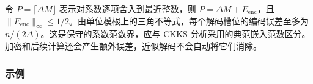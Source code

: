  令 $P=\lceil\Delta M\rfloor$ 表示对系数逐项舍入到最近整数，则 $P=\Delta M+E_{\mathrm{enc}}$，且 $\|E_{\mathrm{enc}}\|_\infty\leq 1/2$。由单位模根上的三角不等式，每个解码槽位的编码误差至多为 $n/(2\Delta)$。这是保守的系数范数界，应与 CKKS 分析采用的典范嵌入范数区分。加密和后续计算还会产生额外误差，近似解码不会自动将它们消除。


\subsubsection{示例}
\label{subsubsec:ckks-encoding-ex}


